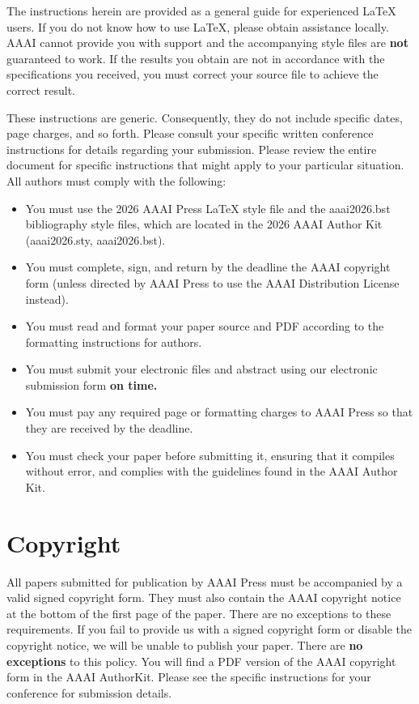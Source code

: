 \documentclass[letterpaper]{article} %
\begin{document}
The instructions herein are provided as a general guide for experienced \LaTeX{} users. If you do not know how to use \LaTeX{}, please obtain assistance locally. AAAI cannot provide you with support and the accompanying style files are \textbf{not} guaranteed to work. If the results you obtain are not in accordance with the specifications you received, you must correct your source file to achieve the correct result.

These instructions are generic. Consequently, they do not include specific dates, page charges, and so forth. Please consult your specific written conference instructions for details regarding your submission. Please review the entire document for specific instructions that might apply to your particular situation. All authors must comply with the following:

\begin{itemize}
\item You must use the 2026 AAAI Press \LaTeX{} style file and the aaai2026.bst bibliography style files, which are located in the 2026 AAAI Author Kit (aaai2026.sty, aaai2026.bst).
\item You must complete, sign, and return by the deadline the AAAI copyright form (unless directed by AAAI Press to use the AAAI Distribution License instead).
\item You must read and format your paper source and PDF according to the formatting instructions for authors.
\item You must submit your electronic files and abstract using our electronic submission form \textbf{on time.}
\item You must pay any required page or formatting charges to AAAI Press so that they are received by the deadline.
\item You must check your paper before submitting it, ensuring that it compiles without error, and complies with the guidelines found in the AAAI Author Kit.
\end{itemize}

\section{Copyright}
All papers submitted for publication by AAAI Press must be accompanied by a valid signed copyright form. They must also contain the AAAI copyright notice at the bottom of the first page of the paper. There are no exceptions to these requirements. If you fail to provide us with a signed copyright form or disable the copyright notice, we will be unable to publish your paper. There are \textbf{no exceptions} to this policy. You will find a PDF version of the AAAI copyright form in the AAAI AuthorKit. Please see the specific instructions for your conference for submission details.
\end{document}
